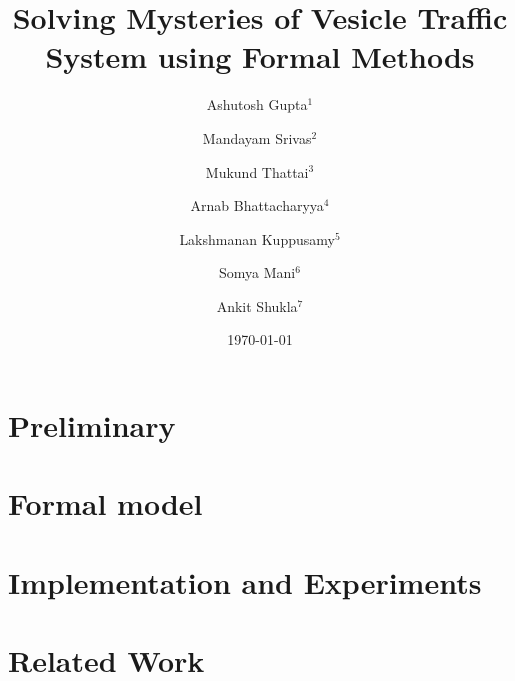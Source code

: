 \documentclass[draft]{llncs}
\begin{document}
\title{Solving Mysteries of Vesicle Traffic System using Formal Methods}

\author{Ashutosh Gupta$^1$ \and Mandayam Srivas$^2$ \and Mukund Thattai$^3$ \and Arnab Bhattacharyya$^4$ \and Lakshmanan Kuppusamy$^5$ \and Somya Mani$^6$ \and Ankit Shukla$^7$ } 


\date{\today}

\maketitle

\begin{abstract}

\end{abstract}

%

\clearpage
\section{Preliminary}
\label{sec:prelim}


\section{Formal model}
\label{sec:model}


\section{Implementation and Experiments}
\label{sec:experiments}


\section{Related Work}
\label{sec:related}





\appendix
\clearpage
\end{document}
